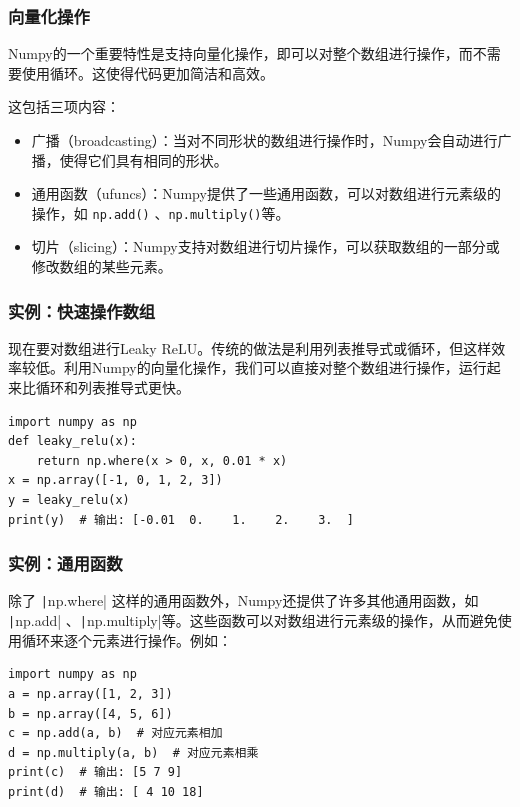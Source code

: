 \begin{frame}[fragile]
    \frametitle{向量化操作}

    Numpy的一个重要特性是支持向量化操作，即可以对整个数组进行操作，而不需要使用循环。这使得代码更加简洁和高效。

    这包括三项内容：
    \begin{itemize}
        \item 广播（broadcasting）：当对不同形状的数组进行操作时，Numpy会自动进行广播，使得它们具有相同的形状。
            \item 通用函数（ufuncs）：Numpy提供了一些通用函数，可以对数组进行元素级的操作，如 \texttt{np.add()} 、\texttt{np.multiply()}等。
        \item 切片（slicing）：Numpy支持对数组进行切片操作，可以获取数组的一部分或修改数组的某些元素。
    \end{itemize}

\end{frame}

\begin{frame}[fragile]
    \frametitle{实例：快速操作数组}

    现在要对数组进行Leaky ReLU。传统的做法是利用列表推导式或循环，但这样效率较低。利用Numpy的向量化操作，我们可以直接对整个数组进行操作，运行起来比循环和列表推导式更快。

    \begin{verbatim}
import numpy as np
def leaky_relu(x):
    return np.where(x > 0, x, 0.01 * x)
x = np.array([-1, 0, 1, 2, 3])
y = leaky_relu(x)
print(y)  # 输出: [-0.01  0.    1.    2.    3.  ]
    \end{verbatim}

\end{frame}

\begin{frame}[fragile]
    \frametitle{实例：通用函数}

    除了 \texttt|np.where| 这样的通用函数外，Numpy还提供了许多其他通用函数，如 \texttt|np.add| 、\texttt|np.multiply|等。这些函数可以对数组进行元素级的操作，从而避免使用循环来逐个元素进行操作。例如：
    \begin{verbatim}
import numpy as np
a = np.array([1, 2, 3])
b = np.array([4, 5, 6])
c = np.add(a, b)  # 对应元素相加
d = np.multiply(a, b)  # 对应元素相乘
print(c)  # 输出: [5 7 9]
print(d)  # 输出: [ 4 10 18]
    \end{verbatim}

\end{frame}


